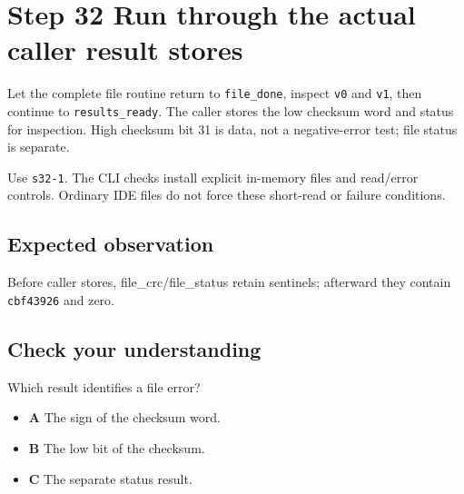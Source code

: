 \section{Step 32 Run through the actual caller result stores}\label{crc-s32}

Let the complete file routine return to \texttt{file\_done}, inspect \texttt{v0} and \texttt{v1}, then continue to \texttt{results\_ready}. The caller stores the low checksum word and status for inspection. High checksum bit 31 is data, not a negative-error test; file status is separate.

Use \texttt{s32-1}. The CLI checks install explicit in-memory files and read/error controls. Ordinary IDE files do not force these short-read or failure conditions.

\subsection{Expected observation}
Before caller stores, file\_crc/file\_status retain sentinels; afterward they contain \texttt{cbf43926} and zero.

\subsection{Check your understanding}
Which result identifies a file error?

\begin{itemize}
  \item \textbf{A} The sign of the checksum word.
  \item \textbf{B} The low bit of the checksum.
  \item \textbf{C} The separate status result.
\end{itemize}
